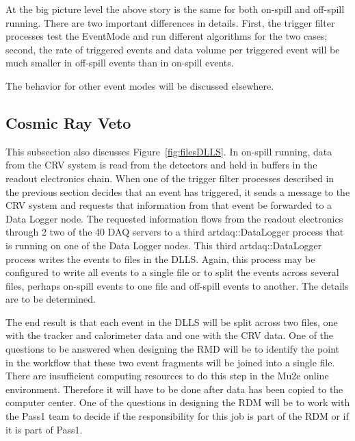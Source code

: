 
At the big picture level the above story is the same for both on-spill and off-spill running.
There are two important differences in details.
First, the trigger filter processes test the EventMode
and run different algorithms for the two cases;
second, the rate of triggered events
and data volume per triggered event will be much smaller in off-spill events than in on-spill events.


The behavior for other event modes will be discussed elsewhere.

\subsection{Cosmic Ray Veto}
\label{ssec:CRV}

This subsection also discusses Figure~\ref{fig:filesDLLS}.
In on-spill running,
data from the CRV system is read from the detectors and held in buffers in the
readout electronics chain.
When one of the trigger filter processes described in the previous section
decides that an event has triggered,
it sends a message to the CRV system and requests that information from that
event be forwarded to a Data Logger node.
The requested information flows from the readout electronics through 2 two of the 40 DAQ servers
to a third {\code artdaq::DataLogger} process that is running on one of the Data Logger nodes.
This third {\code artdaq::DataLogger} process writes the events to files in the DLLS.
Again, this process may be configured to write all events to a single file
or to split the events across several files,
perhaps on-spill events to one file and off-spill events to another.
The details are to be determined.


The end result is that each event in the DLLS will be split across two files, one with the
tracker and calorimeter data and one with the CRV data.
One of the questions to be answered when designing the RMD will be to identify
the point in the workflow that these two event fragments will be joined into a single file.
There are insufficient computing resources to do this step in the Mu2e online environment.
Therefore it will have to be done after data has been copied to the computer center.
One of the questions in designing the RDM will be to work with the Pass1 team to
decide if the responsibility for this job is part of the RDM or if it is part of Pass1.

